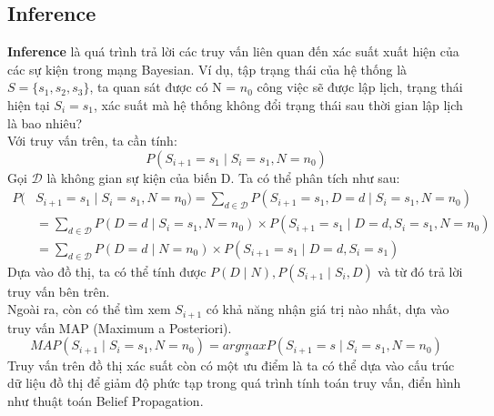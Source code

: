 \documentclass{my_style}
\begin{document}
\subsection{Inference}
\textbf{Inference} là quá trình trả lời các truy vấn liên quan đến xác suất xuất hiện của các sự kiện trong mạng Bayesian. Ví dụ, tập trạng thái của hệ thống là $S = \{s_{1}, s_{2}, s_{3}\}$, ta quan sát được có N = $n_{0}$ công việc sẽ được lập lịch, trạng thái hiện tại $S_{i} = s_{1}$, xác suất mà hệ thống không đổi trạng thái sau thời gian lập lịch là bao nhiêu? \\
Với truy vấn trên, ta cần tính: 
\begin{equation*}
	P(S_{i+1} = s_{1} \mid S_{i} = s_{1}, N = n_{0})
\end{equation*}
Gọi $\mathcal{D}$ là không gian sự kiện của biến D. Ta có thể phân tích như sau: 
\begin{align*}
	P(&S_{i+1} = s_{1} \mid S_{i} = s_{1}, N = n_{0}) = \sum_{d \in \mathcal{D}}P(S_{i+1} = s_{1}, D = d \mid S_{i} = s_{1}, N = n_{0}) \\
			&= \sum_{d \in \mathcal{D}}P(D = d \mid S_{i} = s_{1}, N = n_{0}) \times P(S_{i + 1} = s_{1} \mid D = d, S_{i} = s_{1}, N = n_{0}) \\
			&= \sum_{d \in \mathcal{D}}P(D = d \mid N = n_{0}) \times P(S_{i+1} = s_{1} \mid D = d, S_{i} = s_{1})		
\end{align*}
Dựa vào đồ thị, ta có thể tính được $P(D \mid N), P(S_{i+1} \mid S_{i}, D)$ và từ đó trả lời truy vấn bên trên. \\
Ngoài ra, còn có thể tìm xem $S_{i + 1}$ có khả năng nhận giá trị nào nhất, dựa vào truy vấn MAP (Maximum a Posteriori). 
\begin{equation}
	MAP(S_{i+1} \mid S_{i} = s_{1}, N = n_{0}) = arg\underset{s}maxP(S_{i + 1} = s \mid S_{i} = s_{1}, N = n_{0})
\end{equation}
Truy vấn trên đồ thị xác suất còn có một ưu điểm là ta có thể dựa vào cấu trúc dữ liệu đồ thị để giảm độ phức tạp trong quá trình tính toán truy vấn, điển hình như thuật toán Belief Propagation\cite{29}.\\
\end{document}
